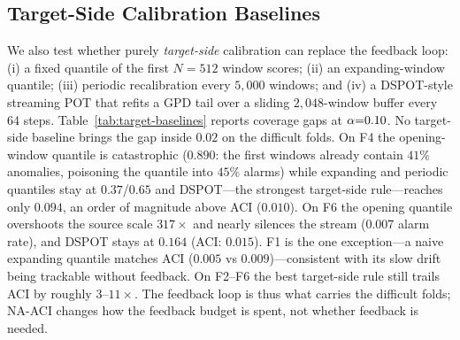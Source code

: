 \subsection{Target-Side Calibration Baselines}
\label{sec:target-baselines}
We also test whether purely \emph{target-side} calibration can replace the feedback loop: (i) a fixed quantile of the first $N{=}512$ window scores; (ii) an expanding-window quantile; (iii) periodic recalibration every $5{,}000$ windows; and (iv) a DSPOT-style streaming POT that refits a GPD tail over a sliding $2{,}048$-window buffer every 64 steps. Table~\ref{tab:target-baselines} reports coverage gaps at $\alphaNom{=}0.10$. No target-side baseline brings the gap inside $0.02$ on the difficult folds. On F4 the opening-window quantile is catastrophic ($0.890$: the first windows already contain $41\%$ anomalies, poisoning the quantile into $45\%$ alarms) while expanding and periodic quantiles stay at $0.37$/$0.65$ and DSPOT---the strongest target-side rule---reaches only $0.094$, an order of magnitude above ACI ($0.010$). On F6 the opening quantile overshoots the source scale $317\times$ and nearly silences the stream ($0.007$ alarm rate), and DSPOT stays at $0.164$ (ACI: $0.015$). F1 is the one exception---a naive expanding quantile matches ACI ($0.005$ vs $0.009$)---consistent with its slow drift being trackable without feedback. On F2--F6 the best target-side rule still trails ACI by roughly $3$--$11\times$. The feedback loop is thus what carries the difficult folds; NA-ACI changes how the feedback budget is spent, not whether feedback is needed.

\begin{table}[t]
\caption{Target-side calibration baselines at $\alphaNom{=}0.10$ (coverage gap, mean of 3 seeds): fixed first-$512$ target quantile, expanding-window quantile, periodic recalibration ($K{=}5{,}000$), DSPOT-style streaming POT. Compare ACI by row (Table~\ref{tab:main}); only F1-expanding is competitive.}
\label{tab:target-baselines}
\centering
\small
{}
\end{table}

